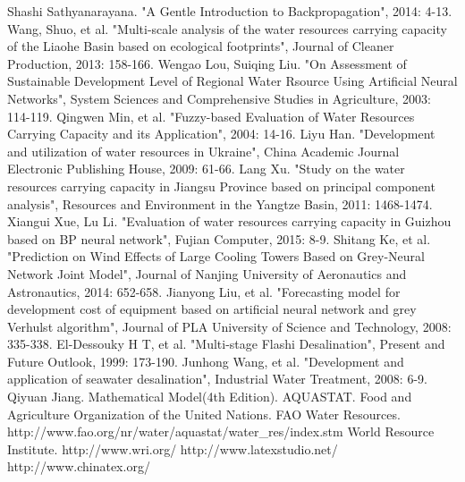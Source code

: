 \begin{thebibliography}{99}
Shashi Sathyanarayana. "A Gentle Introduction to Backpropagation", 2014: 4-13.
Wang, Shuo, et al. "Multi-scale analysis of the water resources carrying capacity of the Liaohe Basin based on ecological footprints", Journal of Cleaner Production, 2013: 158-166.
Wengao Lou, Suiqing Liu. "On Assessment of Sustainable Development Level of Regional Water Rsource Using Artificial Neural Networks", System Sciences and Comprehensive Studies in Agriculture, 2003: 114-119.
Qingwen Min, et al. "Fuzzy-based Evaluation of Water Resources Carrying Capacity and its Application", 2004: 14-16.
Liyu Han. "Development and utilization of water resources in Ukraine", China Academic Journal Electronic Publishing House, 2009: 61-66.
Lang Xu. "Study on the water resources carrying capacity in Jiangsu Province based on principal component analysis", Resources and Environment in the Yangtze Basin, 2011: 1468-1474.
Xiangui Xue, Lu Li. "Evaluation of water resources carrying capacity in Guizhou based on BP neural network", Fujian Computer, 2015: 8-9.
Shitang Ke, et al. "Prediction on Wind Effects of Large Cooling Towers Based on Grey-Neural Network Joint Model", Journal of Nanjing University of Aeronautics and Astronautics, 2014: 652-658.
Jianyong Liu, et al. "Forecasting model for development cost of equipment based on artificial neural network and grey Verhulst algorithm", Journal of PLA University of Science and Technology, 2008: 335-338.
El-Dessouky H T, et al. "Multi-stage Flashi Desalination", Present and Future Outlook, 1999: 173-190.
Junhong Wang, et al. "Development and application of seawater desalination", Industrial Water Treatment, 2008: 6-9.
Qiyuan Jiang. Mathematical Model(4th Edition).
AQUASTAT. Food and Agriculture Organization of the United Nations. FAO Water Resources. http://www.fao.org/nr/water/aquastat/water\_res/index.stm
World Resource Institute. http://www.wri.org/
http://www.latexstudio.net/
http://www.chinatex.org/
\end{thebibliography}

